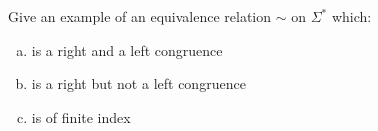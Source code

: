 \documentclass[a4paper,12pt]{amsart}
\begin{document}
\medskip\begin{problem}

    Give an example of an equivalence relation $\sim$ on $\Sigma^*$ which:

    \medskip
    
    \begin{enumerate}[(a)]\setlength\itemsep{12pt}
        \item is a right and a left congruence
        \item is a right but not a left congruence
        \item is of finite index
    \end{enumerate}

\end{problem}
\end{document}
